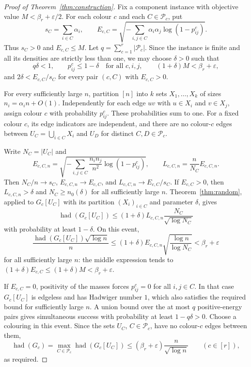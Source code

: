 \documentclass[11pt]{article}
\newcommand{\had}{\operatorname{had}}
\newcommand{\PP}{\mathcal P}
\begin{document}
\begin{proof}[Proof of Theorem~\ref{thm:construction}]
Fix a component instance with objective value $M<\beta_r+\varepsilon/2$.
For each colour $c$ and each $C\in\PP_c$, put
\[
 s_C=\sum_{i\in C}\alpha_i,\qquad
 E_{c,C}=\sqrt{-\sum_{i,j\in C}\alpha_i\alpha_j\log(1-p^c_{ij})}.
\]
Thus $s_C>0$ and $E_{c,C}\leq M$. Let $q=\sum_{c=1}^r|\PP_c|$.
Since the instance is finite and all its densities are strictly less than
one, we may choose $\delta>0$ such that
\[
 q\delta<1,\qquad
 p^c_{ij}\leq1-\delta\quad\text{for all }c,i,j,\qquad
 (1+\delta)M<\beta_r+\varepsilon,
\]
and $2\delta<E_{c,C}/s_C$ for every pair $(c,C)$ with $E_{c,C}>0$.

For every sufficiently large $n$, partition $[n]$ into $k$ sets
$X_1,\ldots,X_k$ of sizes $n_i=\alpha_in+O(1)$. Independently for each
edge $uv$ with $u\in X_i$ and $v\in X_j$, assign colour $c$ with probability
$p^c_{ij}$. These probabilities sum to one. For a fixed colour $c$, its edge
indicators are independent, and there are no colour-$c$ edges between
$U_C=\bigcup_{i\in C}X_i$ and $U_D$ for distinct $C,D\in\PP_c$.

Write $N_C=|U_C|$ and
\[
 E_{c,C,n}=\sqrt{-\sum_{i,j\in C}
              \frac{n_in_j}{n^2}\log(1-p^c_{ij})},\qquad
 L_{c,C,n}=\frac{n}{N_C}E_{c,C,n}.
\]
Then $N_C/n\to s_C$, $E_{c,C,n}\to E_{c,C}$, and
$L_{c,C,n}\to E_{c,C}/s_C$. If $E_{c,C}>0$, then
$L_{c,C,n}>\delta$ and $N_C\geq n_0(\delta)$ for all sufficiently large $n$.
Theorem~\ref{thm:random}, applied to $G_c[U_C]$ with its partition
$(X_i)_{i\in C}$ and parameter $\delta$, gives
\[
 \had(G_c[U_C])\leq(1+\delta)L_{c,C,n}
                         \frac{N_C}{\sqrt{\log N_C}}
\]
with probability at least $1-\delta$. On this event,
\[
 \frac{\had(G_c[U_C])\sqrt{\log n}}{n}
 \leq(1+\delta)E_{c,C,n}\sqrt{\frac{\log n}{\log N_C}}
 <\beta_r+\varepsilon
\]
for all sufficiently large $n$: the middle expression tends to
$(1+\delta)E_{c,C}\leq(1+\delta)M<\beta_r+\varepsilon$.

If $E_{c,C}=0$, positivity of the masses forces $p^c_{ij}=0$ for all
$i,j\in C$. In that case $G_c[U_C]$ is edgeless and has Hadwiger number
$1$, which also satisfies the required bound for sufficiently large $n$.
A union bound over the at most $q$ positive-energy pairs gives simultaneous
success with probability at least $1-q\delta>0$. Choose a colouring in this
event. Since the sets $U_C$, $C\in\PP_c$, have no colour-$c$ edges between
them,
\[
 \had(G_c)=\max_{C\in\PP_c}\had(G_c[U_C])
 \leq(\beta_r+\varepsilon)\frac{n}{\sqrt{\log n}}
 \qquad(c\in[r]),
\]
as required.
\end{proof}
\end{document}
